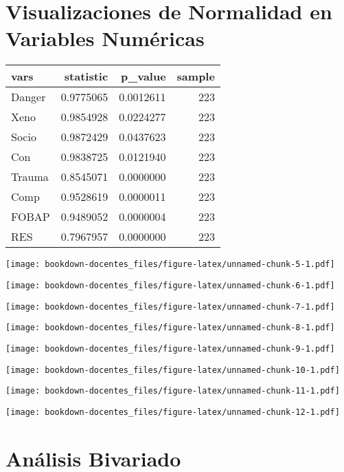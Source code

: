 \documentclass[
]{book}
\begin{document}
\hypertarget{visualizaciones-de-normalidad-en-variables-numuxe9ricas}{%
\section{Visualizaciones de Normalidad en Variables Numéricas}\label{visualizaciones-de-normalidad-en-variables-numuxe9ricas}}

\begin{table}[H]
\centering
\begin{tabular}[t]{l|r|r|r}
\hline
vars & statistic & p\_value & sample\\
\hline
Danger & 0.9775065 & 0.0012611 & 223\\
\hline
Xeno & 0.9854928 & 0.0224277 & 223\\
\hline
Socio & 0.9872429 & 0.0437623 & 223\\
\hline
Con & 0.9838725 & 0.0121940 & 223\\
\hline
Trauma & 0.8545071 & 0.0000000 & 223\\
\hline
Comp & 0.9528619 & 0.0000011 & 223\\
\hline
FOBAP & 0.9489052 & 0.0000004 & 223\\
\hline
RES & 0.7967957 & 0.0000000 & 223\\
\hline
\end{tabular}
\end{table}

\texttt{[image: bookdown-docentes\_files/figure-latex/unnamed-chunk-5-1.pdf]}

\texttt{[image: bookdown-docentes\_files/figure-latex/unnamed-chunk-6-1.pdf]}

\texttt{[image: bookdown-docentes\_files/figure-latex/unnamed-chunk-7-1.pdf]}

\texttt{[image: bookdown-docentes\_files/figure-latex/unnamed-chunk-8-1.pdf]}

\texttt{[image: bookdown-docentes\_files/figure-latex/unnamed-chunk-9-1.pdf]}

\texttt{[image: bookdown-docentes\_files/figure-latex/unnamed-chunk-10-1.pdf]}

\texttt{[image: bookdown-docentes\_files/figure-latex/unnamed-chunk-11-1.pdf]}

\texttt{[image: bookdown-docentes\_files/figure-latex/unnamed-chunk-12-1.pdf]}

\hypertarget{anuxe1lisis-bivariado}{%
\section{Análisis Bivariado}\label{anuxe1lisis-bivariado}}
\end{document}
